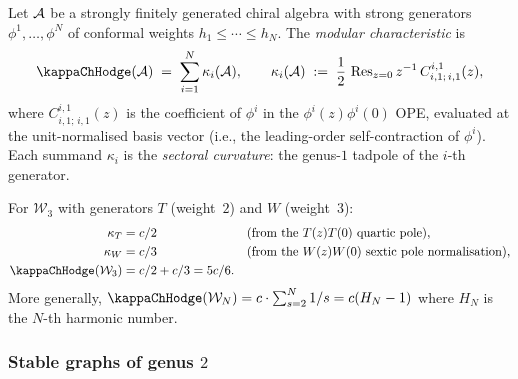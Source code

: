 \begin{definition}
\label{def:kappa-hessian-trace}
Let $\mathcal{A}$ be a strongly finitely generated chiral algebra with
strong generators $\phi^1, \ldots, \phi^N$ of conformal weights
$h_1 \leq \cdots \leq h_N$. The \emph{modular characteristic} is
\begin{equation}\label{eq:kappa-hessian}
\kappaChHodge(\cA) \;=\; \sum_{i=1}^N \kappa_i(\cA),
\qquad
\kappa_i(\cA) \;:=\; \frac{1}{2}\,
\Res_{z=0} z^{-1}\, C^{i,1}_{i,1;\,i,1}(z),
\end{equation}
where $C^{i,1}_{i,1;\,i,1}(z)$ is the coefficient of $\phi^i$ in the
$\phi^i(z)\phi^i(0)$ OPE, evaluated at the unit-normalised
basis vector (i.e., the leading-order
self-contraction of $\phi^i$). Each summand $\kappa_i$ is the
\emph{sectoral curvature}: the genus-$1$ tadpole of the $i$-th
generator.
\end{definition}

\begin{example}[$\mathcal{W}_3$]
\label{ex:kappa-w3}
For $\mathcal{W}_3$ with generators $T$ (weight~$2$) and $W$
(weight~$3$):
\begin{align}
\kappa_T &= c/2 &&\text{(from the $T(z)T(0)$ quartic pole)},
\label{eq:kappa-T}\\
\kappa_W &= c/3 &&\text{(from the $W(z)W(0)$ sextic pole
normalisation)}, \label{eq:kappa-W}\\
\kappaChHodge(\mathcal{W}_3) &= c/2 + c/3 = 5c/6.
\label{eq:kappa-w3}
\end{align}
More generally, $\kappaChHodge(\mathcal{W}_N) = c \cdot
\sum_{s=2}^N 1/s = c(H_N - 1)$ where $H_N$ is the $N$-th
harmonic number.
\end{example}

\subsubsection{Stable graphs of genus $2$}

